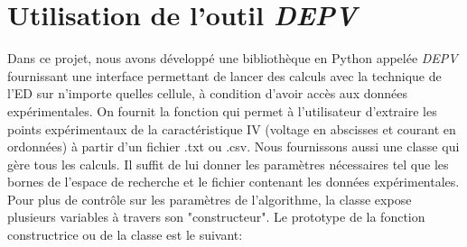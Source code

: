 \section{Utilisation de l'outil \textit{DEPV}}


Dans ce projet, nous avons développé une bibliothèque en Python appelée \textit{DEPV} fournissant une interface permettant de lancer des calculs avec la technique de l'ED sur n'importe quelles cellule, à condition d'avoir accès aux données expérimentales. On fournit la fonction  qui permet à l'utilisateur d'extraire les points expérimentaux de la caractéristique IV (voltage en abscisses et courant en ordonnées) à partir d'un fichier .txt ou .csv. Nous fournissons aussi une classe  qui gère tous les calculs. Il suffit de lui donner les paramètres nécessaires tel que les bornes de l'espace de recherche et le fichier contenant les données expérimentales. Pour plus de contrôle sur les paramètres de l'algorithme, la classe  expose plusieurs variables à travers son "constructeur". Le prototype de la fonction constructrice ou  de la classe  est le suivant:

